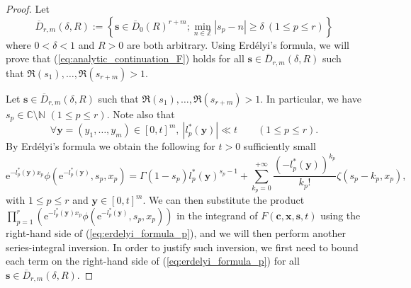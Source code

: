 \documentclass[a4paper]{amsart}
\theoremstyle{remark}
\theoremstyle{definition}
\newcommand{\phie}{\mathrm{e}}
\begin{document}
\begin{proof}
Let 
\begin{equation}
    \overline{D}_{r,m}(\delta,R) := \left\{ \mathbf{s}\in {\overline{D}_0}(R)^{r+m}; \min_{n \in \mathbb{Z}}|s_{p}-n| \geq \delta \ (1 \leq p \leq r)\right\} \label{eq:definition_D_deltaR} 
\end{equation}
where $0 < \delta < 1$ and $R>0$ are both arbitrary. Using Erdélyi's formula, we will prove that (\ref{eq:analytic_continuation_F}) holds for all $\mathbf{s} \in \overline{D}_{r,m}(\delta,R)$ such that $\Re(s_1),\ldots,\Re(s_{r+m})>1$.

Let $\mathbf{s} \in \overline{D}_{r,m}(\delta,R)$ such that $\Re(s_1),\ldots,\Re(s_{r+m})>1$. In particular, we have $s_p \in \mathbb{C} \setminus \mathbb{N}$ $(1 \leq p \leq r)$. Note also that 
\begin{equation}
    \forall \mathbf{y}=(y_1,\ldots,y_m) \in [0,t]^{m}, \ |l_p^*(\mathbf{y})| \ll t \qquad (1 \leq p \leq r). \label{eq:bound_l*_p_theta}
\end{equation}
By Erdélyi's formula we obtain the following for $t>0$ sufficiently small
\begin{equation}
    \phie^{-l_p^*(\mathbf{y})x_p} \phi(\phie^{-l_p^*(\mathbf{y})},s_p,x_p) = \Gamma(1-s_p) l_p^*(\mathbf{y})^{s_p-1} + \sum_{k_p=0}^{+\infty} \frac{(-l_p^*(\mathbf{y}))^{k_p}}{k_p!} \zeta(s_p-k_p,x_p), \label{eq:erdelyi_formula_p}
\end{equation}
with $1 \leq p \leq r$ and $\mathbf{y} \in [0,t]^{m}$. We can then substitute the product $\prod_{p=1}^r \left( \phie^{-l_p^*(\mathbf{y})x_p} \phi(\phie^{-l_p^*(\mathbf{y})},s_p,x_p) \right)$ in the integrand of $F(\mathbf{c},\mathbf{x},\mathbf{s},t)$ using the right-hand side of (\ref{eq:erdelyi_formula_p}), and we will then perform another series-integral inversion. In order to justify such inversion, we first need to bound each term on the right-hand side of (\ref{eq:erdelyi_formula_p}) for all $\mathbf{s} \in \overline{D}_{r,m}(\delta,R)$. 


\end{proof}
\end{document}
